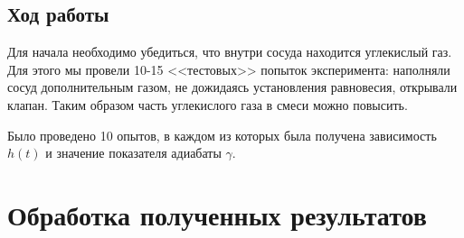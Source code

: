 \documentclass[a4paper,12pt]{report}
\begin{document}
\begin{multicols}{2}
    \subsection*{Ход работы}
    Для начала необходимо убедиться, что внутри сосуда находится углекислый газ. Для этого мы провели 10-15 <<тестовых>> попыток эксперимента: наполняли сосуд дополнительным газом, не дожидаясь установления равновесия, открывали клапан. Таким образом часть углекислого газа в смеси можно повысить.

    Было проведено 10 опытов, в каждом из которых была получена зависимость $h(t)$ и значение показателя адиабаты $\gamma$.
    \end{multicols}

    \section{Обработка полученных результатов}
\end{document}
